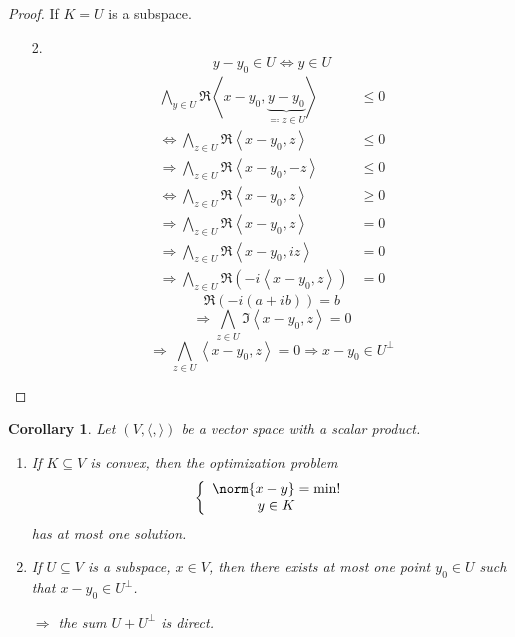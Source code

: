 \documentclass[a4paper,landscape,twocolumn]{article}
\newcommand\functional[1]{\left\langle{#1}\right\rangle}
\newtheorem{cor}{Corollary}
\DeclarePairedDelimiter\norm\lVert\rVert
\begin{document}
\begin{proof}
  If $K = U$ is a subspace.
  \begin{enumerate}
    \item[2.]
    \[ y - y_0 \in U \Leftrightarrow y \in U \]
      \begin{align*}
        \bigwedge_{y \in U} \Re{\functional{x - y_0, \underbrace{y - y_0}_{\eqqcolon z \in U}}} &\leq 0 \\
        \Leftrightarrow \bigwedge_{z \in U} \Re{\functional{x - y_0, z}} &\leq 0 \\
        \Rightarrow \bigwedge_{z \in U} \Re{\functional{x - y_0, -z}} &\leq 0 \\
        \Leftrightarrow \bigwedge_{z \in U} \Re{\functional{x - y_0, z}} &\geq 0 \\
        \Rightarrow \bigwedge_{z \in U} \Re{\functional{x - y_0, z}} &= 0 \\
        \Rightarrow \bigwedge_{z \in U} \Re{\functional{x - y_0, iz}} &= 0 \\
        \Rightarrow \bigwedge_{z \in U} \Re{(-i \functional{x - y_0, z})} &= 0
      \end{align*}
      \[ \Re(-i (a + ib)) = b \]
      \[ \Rightarrow \bigwedge_{z \in U} \Im\functional{x - y_0, z} = 0 \]
      \[ \Rightarrow \bigwedge_{z \in U} \functional{x - y_0, z} = 0 \Rightarrow x - y_0 \in U^\bot \]
  \end{enumerate}
\end{proof}

\begin{cor}
  Let $(V, \langle, \rangle)$ be a vector space with a scalar product.
  \begin{enumerate}
    \item If $K \subseteq V$ is convex, then the optimization problem
      \[
        \left\{
          \begin{array}{c}
            \norm{x - y} = \text{min!} \\
            y \in K
          \end{array}
        \right.
      \]
      has at most one solution.
    \item If $U \subseteq V$ is a subspace, $x \in V$, then there exists at most
      one point $y_0 \in U$ such that $x - y_0 \in U^\bot$.

      $\Rightarrow$ the sum $U + U^\bot$ is direct.
  \end{enumerate}
\end{cor}
\end{document}
